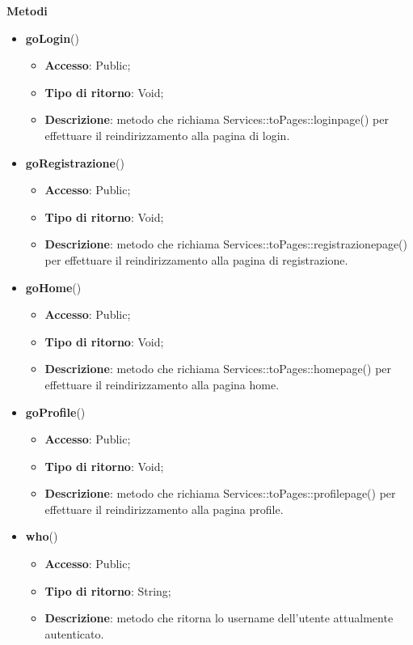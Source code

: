 {	\textbf{Metodi}
	\begin{itemize}
		\item \textbf{goLogin}()
		\begin{itemize}
			\item \textbf{Accesso}: Public;
			\item \textbf{Tipo di ritorno}: Void;
			\item \textbf{Descrizione}: metodo che richiama Services::\-toPages::\-loginpage() per effettuare il reindirizzamento alla pagina di login.
		\end{itemize}
		\item \textbf{goRegistrazione}()
		\begin{itemize}
			\item \textbf{Accesso}: Public;
			\item \textbf{Tipo di ritorno}: Void;
			\item \textbf{Descrizione}: metodo che richiama Services::\-toPages::\-registrazionepage() per effettuare il reindirizzamento alla pagina di registrazione.
		\end{itemize}
		\item \textbf{goHome}()
		\begin{itemize}
			\item \textbf{Accesso}: Public;
			\item \textbf{Tipo di ritorno}: Void;
			\item \textbf{Descrizione}: metodo che richiama Services::\-toPages::\-homepage() per effettuare il reindirizzamento alla pagina home.
		\end{itemize}
		\item \textbf{goProfile}()
		\begin{itemize}
			\item \textbf{Accesso}: Public;
			\item \textbf{Tipo di ritorno}: Void;
			\item \textbf{Descrizione}: metodo che richiama Services::\-toPages::\-profilepage() per effettuare il reindirizzamento alla pagina profile.
		\end{itemize}
		\item \textbf{who}()
		\begin{itemize}
			\item \textbf{Accesso}: Public;
			\item \textbf{Tipo di ritorno}: String;
			\item \textbf{Descrizione}: metodo che ritorna lo username dell'utente attualmente autenticato.
		\end{itemize}

\end{itemize}}
